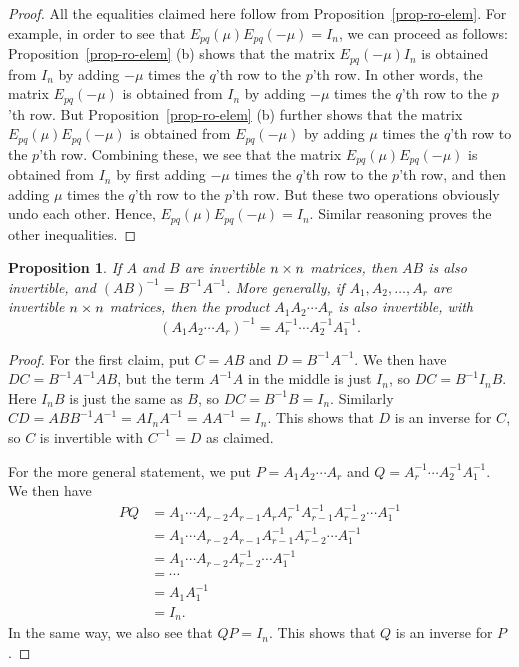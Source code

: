 \documentclass[reqno]{amsart}
\newtheorem{proposition}[theorem]{Proposition}
\theoremstyle{definition}
\begin{document}
\begin{proof}
All the equalities claimed here follow from Proposition~\ref{prop-ro-elem}.
For example, in order to see that $E_{pq}(\mu) E_{pq}(-\mu) = I_n$, we can
proceed as follows: Proposition~\ref{prop-ro-elem} (b) shows that the
matrix $E_{pq}(-\mu) I_n$ is obtained from $I_n$ by adding $-\mu$ times
the $q$'th row to the $p$'th row. In other words, the matrix $E_{pq}(-\mu)$
is obtained from $I_n$ by adding $-\mu$ times the $q$'th row to the $p$'th
row. But Proposition~\ref{prop-ro-elem} (b) further shows that the matrix
$E_{pq}(\mu) E_{pq}(-\mu)$ is obtained from $E_{pq}(-\mu)$ by adding $\mu$
times the $q$'th row to the $p$'th row. Combining these, we see that the
matrix $E_{pq}(\mu) E_{pq}(-\mu)$ is obtained from $I_n$ by first adding
$-\mu$ times the $q$'th row to the $p$'th row, and then adding $\mu$ times
the $q$'th row to the $p$'th row. But these two operations obviously undo
each other. Hence, $E_{pq}(\mu) E_{pq}(-\mu) = I_n$.
Similar reasoning proves the other inequalities.
\end{proof}

\begin{proposition}\label{prop-product-inverse}
 If $A$ and $B$ are invertible $n\times n$ matrices, then $AB$ is also
 invertible, and $(AB)^{-1}=B^{-1}A^{-1}$.  More generally, if
 $A_1,A_2,\dotsc,A_r$ are invertible $n\times n$ matrices, then the
 product $A_1A_2\dotsb A_r$ is also invertible, with 
 \[ (A_1A_2\dotsb A_r)^{-1} = A_r^{-1} \dotsb A_2^{-1} A_1^{-1}. \]
\end{proposition}
\begin{proof}
 For the first claim, put $C=AB$ and $D=B^{-1}A^{-1}$.  We then have 
 $DC=B^{-1}A^{-1}AB$, but the term $A^{-1}A$ in the middle is just
 $I_n$, so $DC=B^{-1}I_nB$.  Here $I_nB$ is just the same as $B$, so
 $DC=B^{-1}B=I_n$.  Similarly
 $CD=ABB^{-1}A^{-1}=AI_nA^{-1}=AA^{-1}=I_n$.  This shows that $D$ is
 an inverse for $C$, so $C$ is invertible with $C^{-1}=D$ as claimed.

 For the more general statement, we put $P=A_1A_2\dotsb A_r$ and
 $Q=A_r^{-1}\dotsb A_2^{-1}A_1^{-1}$.  We then have
 \begin{align*}
  PQ &= A_1\dotsb A_{r-2}A_{r-1}A_r 
        A_r^{-1}A_{r-1}^{-1}A_{r-2}^{-1}\dotsb A_1^{-1} \\
     &= A_1\dotsb A_{r-2}A_{r-1} 
        A_{r-1}^{-1}A_{r-2}^{-1}\dotsb A_1^{-1} \\
     &= A_1\dotsb A_{r-2}
        A_{r-2}^{-1}\dotsb A_1^{-1} \\
     &= \dotsb \\
     &= A_1A_1^{-1} \\
     &= I_n.
 \end{align*}
 In the same way, we also see that $QP=I_n$.  This shows that $Q$ is
 an inverse for $P$.
\end{proof}
\end{document}
